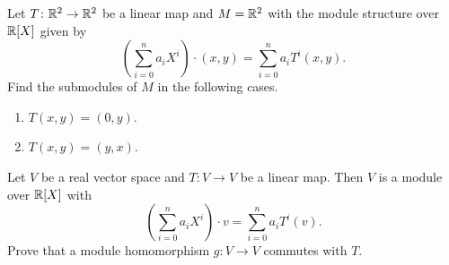 \begin{exercise}
\label{xca:submodules}
Let $T\colon\mathbb{R}^2\to\mathbb{R}^2$ be a linear map and $M=\mathbb{R}^2$ with the module structure 
over $\mathbb{R}[X]$ given by
\[
\left(\sum_{i=0}^n a_iX^i\right)\cdot (x,y)=\sum_{i=0}^n a_iT^i(x,y).
\]
Find the submodules of $M$ in the following cases. 
\begin{enumerate}
    \item $T(x,y)=(0,y)$.
    \item $T(x,y)=(y,x)$.
\end{enumerate}
% 
\end{exercise}



\begin{example}
\label{xca:commuting}
Let $V$ be a real vector space and $T\colon V\to V$ be a linear map. Then 
$V$ is a module over $\mathbb{R}[X]$ with  
\[
\left(\sum_{i=0}^n a_iX^i\right)\cdot v=\sum_{i=0}^n a_iT^i(v).
\]
Prove that a module homomorphism $g\colon V\to V$ commutes with $T$. 
\end{example}

